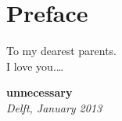 \chapter*{Preface}

To my dearest parents.\\
I love you.\ldots

\begin{flushright}
\LARGE\textbf{unnecessary}
{\makeatletter\itshape
    \@firstname\ \@lastname \\
    Delft, January 2013
\makeatother}
\end{flushright}


